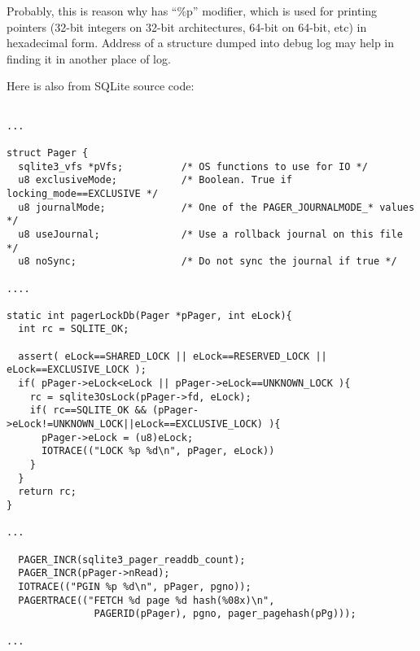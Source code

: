 Probably, this is reason why \printf has ``\%p'' modifier, which is used for printing pointers (32-bit integers
on 32-bit architectures, 64-bit on 64-bit, etc) in hexadecimal form.
Address of a structure dumped into debug log may help in finding it in another place of log.

Here is also from SQLite source code:

\begin{lstlisting}

...

struct Pager {
  sqlite3_vfs *pVfs;          /* OS functions to use for IO */
  u8 exclusiveMode;           /* Boolean. True if locking_mode==EXCLUSIVE */
  u8 journalMode;             /* One of the PAGER_JOURNALMODE_* values */
  u8 useJournal;              /* Use a rollback journal on this file */
  u8 noSync;                  /* Do not sync the journal if true */

....

static int pagerLockDb(Pager *pPager, int eLock){
  int rc = SQLITE_OK;

  assert( eLock==SHARED_LOCK || eLock==RESERVED_LOCK || eLock==EXCLUSIVE_LOCK );
  if( pPager->eLock<eLock || pPager->eLock==UNKNOWN_LOCK ){
    rc = sqlite3OsLock(pPager->fd, eLock);
    if( rc==SQLITE_OK && (pPager->eLock!=UNKNOWN_LOCK||eLock==EXCLUSIVE_LOCK) ){
      pPager->eLock = (u8)eLock;
      IOTRACE(("LOCK %p %d\n", pPager, eLock))
    }
  }
  return rc;
}

...

  PAGER_INCR(sqlite3_pager_readdb_count);
  PAGER_INCR(pPager->nRead);
  IOTRACE(("PGIN %p %d\n", pPager, pgno));
  PAGERTRACE(("FETCH %d page %d hash(%08x)\n",
               PAGERID(pPager), pgno, pager_pagehash(pPg)));

...

\end{lstlisting}

